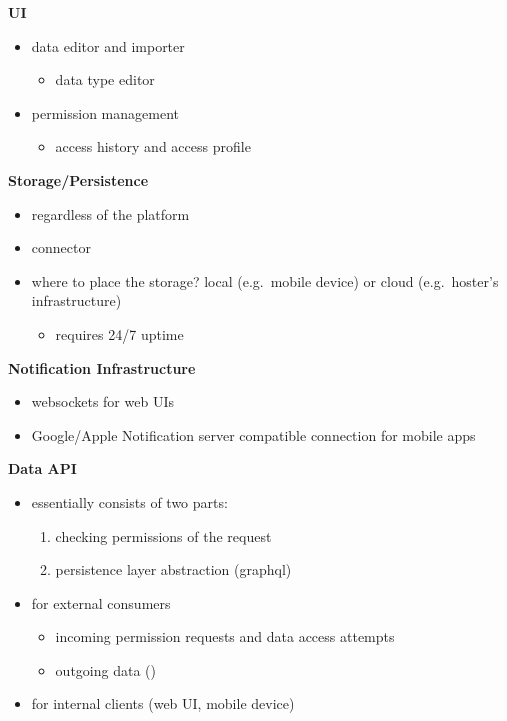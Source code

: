 \documentclass[12pt,english,a4paper,titlepage,cleardoublepage=empty,dottedtoc]{report}
\providecommand{\tightlist}{%
  \setlength{\itemsep}{0pt}\setlength{\parskip}{0pt}}
\begin{document}
\textbf{UI}

\begin{itemize}
\tightlist
\item
  data editor and importer

  \begin{itemize}
  \tightlist
  \item
    data type editor
  \end{itemize}
\item
  permission management

  \begin{itemize}
  \tightlist
  \item
    access history and access profile
  \end{itemize}
\end{itemize}

\textbf{Storage/Persistence}

\begin{itemize}
\tightlist
\item
  regardless of the platform
\item
  connector
\item
  where to place the storage? local (e.g.~mobile device) or cloud
  (e.g.~hoster's infrastructure)

  \begin{itemize}
  \tightlist
  \item
    requires 24/7 uptime
  \end{itemize}
\end{itemize}

\textbf{Notification Infrastructure}

\begin{itemize}
\tightlist
\item
  websockets for web UIs
\item
  Google/Apple Notification server compatible connection for mobile apps
\end{itemize}

\textbf{Data API}

\begin{itemize}
\tightlist
\item
  essentially consists of two parts:

  \begin{enumerate}
  \def\labelenumi{\arabic{enumi})}
  \tightlist
  \item
    checking permissions of the request
  \item
    persistence layer abstraction (graphql)
  \end{enumerate}
\item
  for external consumers

  \begin{itemize}
  \tightlist
  \item
    incoming permission requests and data access attempts
  \item
    outgoing data ()
  \end{itemize}
\item
  for internal clients (web UI, mobile device)
\end{itemize}
\end{document}
